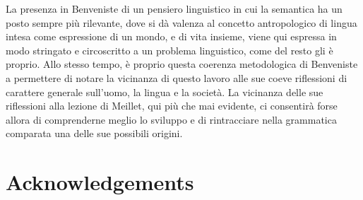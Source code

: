 \documentclass[output=paper]{langsci/langscibook}
\begin{document}
La presenza in Benveniste di un pensiero linguistico in cui la semantica ha un posto sempre più rilevante, dove si dà valenza al concetto antropologico di lingua intesa come espressione di un mondo, e di vita insieme, viene qui espressa in modo stringato e circoscritto a un problema linguistico, come del resto gli è proprio. Allo stesso tempo, è proprio questa coerenza metodologica di Benveniste a permettere di notare la vicinanza di questo lavoro alle sue coeve riflessioni di carattere generale sull’uomo, la lingua e la società. La vicinanza delle sue riflessioni alla lezione di Meillet, qui più che mai evidente, ci consentirà forse allora di comprenderne meglio lo sviluppo e di rintracciare nella grammatica comparata una delle sue possibili origini.



\section*{Acknowledgements}


{\sloppy\printbibliography[heading=subbibliography,notkeyword=this]}
\end{document}
